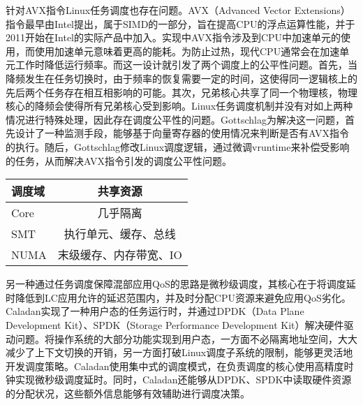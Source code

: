 针对AVX指令Linux任务调度也存在问题。AVX（Advanced Vector Extensions）指令最早由Intel提出，属于SIMD的一部分，旨在提高CPU的浮点运算性能，并于2011开始在Intel的实际产品中加入。实现中AVX指令涉及到CPU中加速单元的使用，而使用加速单元意味着更高的能耗。为防止过热，现代CPU通常会在加速单元工作时降低运行频率。而这一设计就引发了两个调度上的公平性问题。首先，当降频发生在任务切换时，由于频率的恢复需要一定的时间，这使得同一逻辑核上的先后两个任务存在相互相影响的可能。其次，兄弟核心共享了同一个物理核，物理核心的降频会使得所有兄弟核心受到影响。Linux任务调度机制并没有对如上两种情况进行特殊处理，因此存在调度公平性的问题。Gottschlag\citep{gottschlag2020avx}为解决这一问题，首先设计了一种监测手段，能够基于向量寄存器的使用情况来判断是否有AVX指令的执行。随后，Gottschlag修改Linux调度逻辑，通过微调vruntime来补偿受影响的任务，从而解决AVX指令引发的调度公平性问题。


\begin{table}[!htbp]
    \label{tab:resourcesharing}
    \footnotesize%
    \setlength{\tabcolsep}{4pt}%
    \renewcommand{\arraystretch}{1.5}%
    \centering
    \begin{tabular}{lc}
        \hline
        调度域 & 共享资源\\
        \hline
        Core & 几乎隔离\\
        SMT & 执行单元、缓存、总线\\
        NUMA & 末级缓存、内存带宽、IO\\
        \hline
    \end{tabular}
\end{table}

另一种通过任务调度保障混部应用QoS的思路是微秒级调度\citep{ousterhout2019shenango,fried2020caladan,prekas2017zygos}，其核心在于将调度延时降低到LC应用允许的延迟范围内，并及时分配CPU资源来避免应用QoS劣化。Caladan\citep{fried2020caladan}实现了一种用户态的任务运行时，并通过DPDK（Data Plane Development Kit）、SPDK（Storage Performance Development Kit）解决硬件驱动问题。将操作系统的大部分功能实现到用户态，一方面不必隔离地址空间，大大减少了上下文切换的开销，另一方面打破Linux调度子系统的限制，能够更灵活地开发调度策略。Caladan使用集中式的调度模式，在负责调度的核心使用高精度时钟实现微秒级调度延时。同时，Caladan还能够从DPDK、SPDK中读取硬件资源的分配状况，这些额外信息能够有效辅助进行调度决策。

